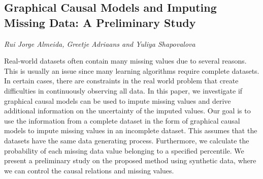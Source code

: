 \documentclass[../booklet.tex]{subfiles}
\begin{document}
\subsection[Graphical Causal Models and Imputing Missing Data: A Preliminary Study. {\it Rui Jorge Almeida, Greetje Adriaans and Yuliya Shapovalova}]{Graphical Causal Models and Imputing Missing Data: A Preliminary Study}
  

\begin{center}
  {\it Rui Jorge Almeida, Greetje Adriaans and Yuliya Shapovalova}
\end{center}



Real-world datasets often contain many missing values due to several reasons. This is usually an issue since many learning algorithms require complete datasets. In certain cases, there are constraints in the real world problem that create difficulties in continuously observing all data. In this paper, we investigate if graphical causal models can be used to impute missing values and derive additional information on the uncertainty of the imputed values. Our goal is to use the information from a complete dataset in the form of graphical causal models to impute missing values in an incomplete dataset. This assumes that the datasets have the same data generating process. Furthermore, we calculate the probability of each missing data value belonging to a specified percentile. We present a preliminary study on the proposed method using synthetic data, where we can control the causal relations and missing values.
\end{document}
